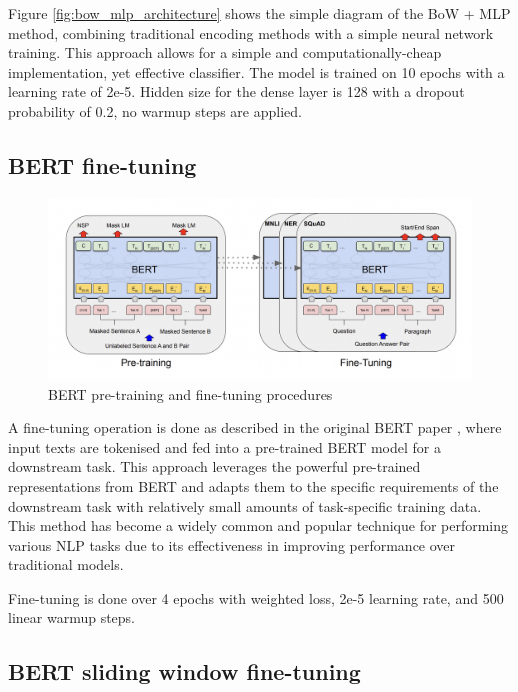 Figure \ref{fig:bow_mlp_architecture} shows the simple diagram of the BoW + MLP method, combining traditional encoding methods with a simple neural network training. This approach allows for a simple and computationally-cheap implementation, yet effective classifier. The model is trained on 10 epochs with a learning rate of 2e-5. Hidden size for the dense layer is 128 with a dropout probability of 0.2, no warmup steps are applied.

\subsection{BERT fine-tuning}

\begin{figure}[htbp]
    \centering
    \includegraphics[width=0.9\linewidth]{images/bert_finetuning.png}
    \caption{BERT pre-training and fine-tuning procedures \cite{devlin-2019-bert}}
    \label{fig:bert_finetuning}
\end{figure}

A fine-tuning operation is done as described in the original BERT paper \cite{devlin-2019-bert}, where input texts are tokenised and fed into a pre-trained BERT model for a downstream task. This approach leverages the powerful pre-trained representations from BERT and adapts them to the specific requirements of the downstream task with relatively small amounts of task-specific training data. This method has become a widely common and popular technique for performing various NLP tasks due to its effectiveness in improving performance over traditional models.

Fine-tuning is done over 4 epochs with weighted loss, 2e-5 learning rate, and 500 linear warmup steps.

\subsection{BERT sliding window fine-tuning}

